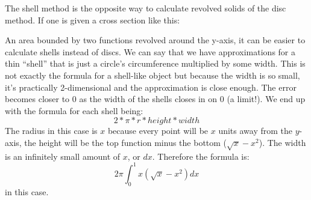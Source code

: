 \documentclass[../revisedmain.tex]{subfiles}
\begin{document}
The shell method is the opposite way to calculate revolved solids of the disc method. If one is given a cross section like this:
\begin{center}
\end{center}
An area bounded by two functions revolved around the y-axis, it can be easier to calculate shells instead of discs. We can say that we have approximations for a thin ``shell'' that is just a circle's circumference multiplied by some width. This is not exactly the formula for a shell-like object but because the width is so small, it's practically 2-dimensional and the approximation is close enough. The error becomes closer to 0 as the width of the shells closes in on 0 (a limit!). We end up with the formula for each shell being: $$2*\pi*r*height*width$$The radius in this case is $x$ because every point will be $x$ units away from the $y$-axis, the height will be the top function minus the bottom ($\sqrt{x}-x^2$). The width is an infinitely small amount of $x$, or $dx$. Therefore the formula is:$$2\pi\int_{0}^{1}x(\sqrt{x}-x^2)dx$$  in this case.
\end{document}
